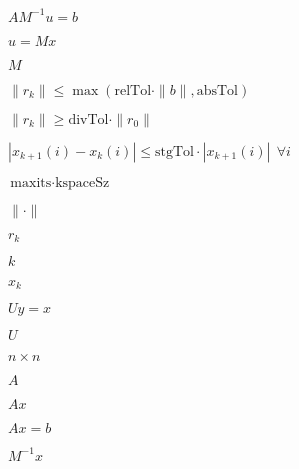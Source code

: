 \documentclass{article}
\begin{document}
$AM^{-1}u = b$
\pagebreak

$u = Mx$
\pagebreak

$M$
\pagebreak

$\|r_k\| \leq \max(\text{relTol}\cdot\|b\|, \text{absTol})$
\pagebreak

$\|r_k\| \geq \text{divTol}\cdot\|r_0\|$
\pagebreak

$|x_{k+1}(i) - x_k(i)| \leq \text{stgTol}\cdot|x_{k+1}(i)|~~\forall i$
\pagebreak

$\text{maxits}\cdot\text{kspaceSz}$
\pagebreak

$\|\cdot\|$
\pagebreak

$r_k$
\pagebreak

$k$
\pagebreak

$x_k$
\pagebreak

$Uy = x$
\pagebreak

$U$
\pagebreak

$n\times n$
\pagebreak

$A$
\pagebreak

$Ax$
\pagebreak

$Ax = b$
\pagebreak

$M^{-1}x$
\pagebreak
\end{document}
